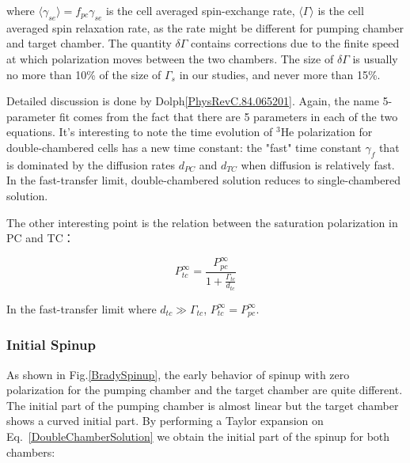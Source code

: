 where $\langle\gamma_{se}\rangle=f_{pc}\gamma_{se}$ is the cell averaged spin-exchange rate, $\langle\Gamma\rangle$ is the cell averaged spin relaxation rate, as the rate might be different for pumping chamber and target chamber. The quantity $\delta\Gamma$ contains corrections due to the finite speed at which polarization moves between the two chambers. The size of $\delta\Gamma$ is usually no more than 10\% of the size of $\Gamma_{s}$ in our studies, and never more than 15\%.

Detailed discussion is done by Dolph\ref{PhysRevC.84.065201}. Again, the name 5-parameter fit comes from the fact that there are 5 parameters in each of the two equations. It's interesting to note the time evolution of $^{3}$He polarization for double-chambered cells has a new time constant: the "fast" time constant $\gamma_{f}$ that is dominated by the diffusion rates $d_{PC}$ and $d_{TC}$ when diffusion is relatively fast. In the fast-transfer limit, double-chambered solution reduces to single-chambered solution. 

The other interesting point is the relation between the saturation polarization in PC and TC：

\begin{equation}
P_{tc}^{\infty}=\frac{P_{pc}^{\infty}}{1+\frac{\Gamma_{tc}}{d_{tc}}}
\end{equation}

In the fast-transfer limit where $d_{tc}\gg \Gamma_{tc}$, $P_{tc}^{\infty}=P_{pc}^{\infty}$. 

\subsubsection{Initial Spinup}

As shown in Fig.\ref{BradySpinup}, the early behavior of spinup with zero polarization for the pumping chamber and the target chamber are quite different. The initial part of the pumping chamber is almost linear but the target chamber shows a curved initial part. By performing a Taylor expansion on Eq.~\ref{DoubleChamberSolution} we obtain the initial part of the spinup for both chambers:

